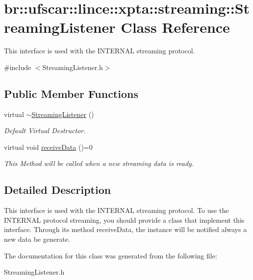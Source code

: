 \hypertarget{classbr_1_1ufscar_1_1lince_1_1xpta_1_1streaming_1_1StreamingListener}{
\section{br::ufscar::lince::xpta::streaming::StreamingListener Class Reference}
\label{classbr_1_1ufscar_1_1lince_1_1xpta_1_1streaming_1_1StreamingListener}
}


This interface is used with the INTERNAL streaming protocol.  




{\ttfamily \#include $<$StreamingListener.h$>$}

\subsection*{Public Member Functions}
\begin{DoxyCompactItemize}
\item 
\hypertarget{classbr_1_1ufscar_1_1lince_1_1xpta_1_1streaming_1_1StreamingListener_a78b395b2af54611a4daca571035e9e77}{
virtual \hyperlink{classbr_1_1ufscar_1_1lince_1_1xpta_1_1streaming_1_1StreamingListener_a78b395b2af54611a4daca571035e9e77}{$\sim$StreamingListener} ()}
\label{classbr_1_1ufscar_1_1lince_1_1xpta_1_1streaming_1_1StreamingListener_a78b395b2af54611a4daca571035e9e77}

\begin{DoxyCompactList}\small\item\em Default Virtual Destructor. \item\end{DoxyCompactList}\item 
\hypertarget{classbr_1_1ufscar_1_1lince_1_1xpta_1_1streaming_1_1StreamingListener_ab8354971757777492607134860085d64}{
virtual void \hyperlink{classbr_1_1ufscar_1_1lince_1_1xpta_1_1streaming_1_1StreamingListener_ab8354971757777492607134860085d64}{receiveData} ()=0}
\label{classbr_1_1ufscar_1_1lince_1_1xpta_1_1streaming_1_1StreamingListener_ab8354971757777492607134860085d64}

\begin{DoxyCompactList}\small\item\em This Method will be called when a new streaming data is ready. \item\end{DoxyCompactList}\end{DoxyCompactItemize}


\subsection{Detailed Description}
This interface is used with the INTERNAL streaming protocol. To use the INTERNAL protocol streaming, you should provide a class that implement this interface. Through its method receiveData, the instance will be notified always a new data be generate. 

The documentation for this class was generated from the following file:\begin{DoxyCompactItemize}
\item 
StreamingListener.h\end{DoxyCompactItemize}

